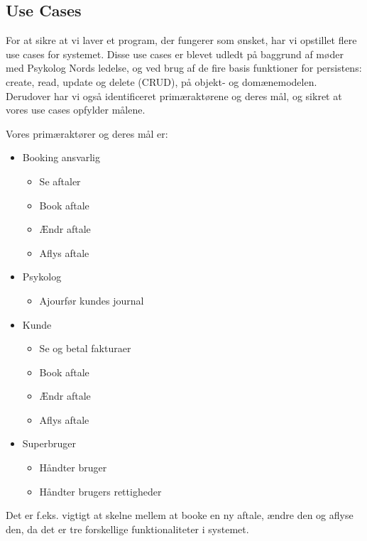 \subsection{Use Cases}
For at sikre at vi laver et program, der fungerer som ønsket, har vi opstillet flere use cases for systemet.
Disse use cases er blevet udledt på baggrund af møder med Psykolog Nords ledelse, og ved brug af de fire basis funktioner for persistens: create, read, update og delete (CRUD), på objekt- og domænemodelen.
Derudover har vi også identificeret primæraktørene og deres mål, og sikret at vores use cases opfylder målene.

Vores primæraktører og deres mål er:

\begin{itemize}
    \item Booking ansvarlig
        \begin{itemize}
            \item Se aftaler
            \item Book aftale
            \item Ændr aftale
            \item Aflys aftale
        \end{itemize}
    \item Psykolog
        \begin{itemize}
            \item Ajourfør kundes journal
        \end{itemize}
    \item Kunde
        \begin{itemize}
            \item Se og betal fakturaer
            \item Book aftale
            \item Ændr aftale
            \item Aflys aftale
        \end{itemize}
    \item Superbruger
        \begin{itemize}
            \item Håndter bruger
            \item Håndter brugers rettigheder
        \end{itemize}

\end{itemize}

Det er f.eks. vigtigt at skelne mellem at booke en ny aftale, ændre den og aflyse den, da det er tre forskellige funktionaliteter i systemet.

